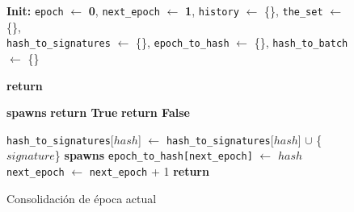 \begin{figure}[t!]
  \begin{adjustbox}{minipage=[t]{\columnwidth}}
    \begin{algorithm}[H]
      \renewcommand{\thealgorithm}{ABCI Hashchain - Parte 1}
      \caption{Consolidación de época actual}%
      \label{alg:abci-hash1}%
      \small
      \begin{algorithmic}[1]
            \State \textbf{Init:} \texttt{epoch} $\leftarrow$ \textbf{0}, \texttt{next\_epoch} $\leftarrow$ \textbf{1},
			\texttt{history} $\leftarrow$ \{\}, \texttt{the\_set} $\leftarrow$ \{\},
			\\ \texttt{hash\_to\_signatures} $\leftarrow$ \{\}, \texttt{epoch\_to\_hash} $\leftarrow$ \{\}, \texttt{hash\_to\_batch} $\leftarrow$ \{\}

            \label{alg:hash_check_tx}
            				\State \textbf{return} 
            			\EndIf

            		
                		\State \textbf{spawns} \label{line:spawn-reverse-checktx}
                		\State \textbf{return True}
                	\Else
                		\State \textbf{return False}
                	\EndIf
            		\EndFunction
      
            \label{alg:hash_deliver_tx}
            		\label{line:hash-check-sign}
            			\State \texttt{hash\_to\_signatures}[$hash$] $\leftarrow$ \texttt{hash\_to\_signatures}[$hash$] $\cup$  \{$signature$\}\label{alg:hash-new-sign}
							\State \textbf{spawns} \label{alg:spawn-reverse}
						\EndIf
            				\State \texttt{epoch\_to\_hash[next\_epoch]} $\leftarrow$ $hash$\label{alg:hash-epoch-to-hash}
            				\State \texttt{next\_epoch} $\leftarrow$ \texttt{next\_epoch} + 1
               	 	\EndIf
               	 \EndIf
                \State \textbf{return}
            \EndFunction
            

\end{algorithmic}
\end{algorithm}
\end{adjustbox}
\end{figure}
